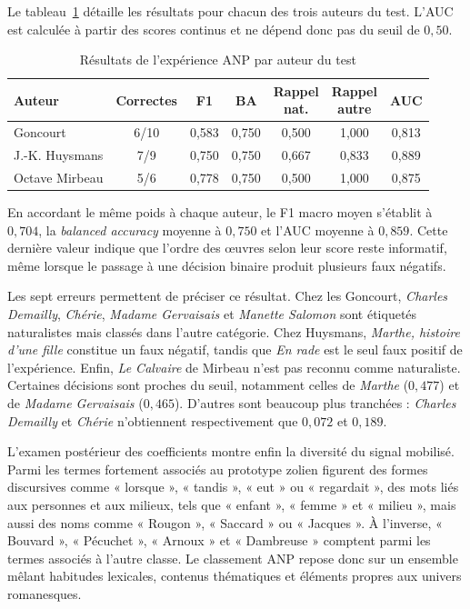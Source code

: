Le tableau~\ref{tab:resultats_anp_auteurs} détaille les résultats pour chacun des trois auteurs du test. L'AUC est calculée à partir des scores continus et ne dépend donc pas du seuil de $0{,}50$.

\begin{table}[H]
    \centering
    \caption{Résultats de l'expérience ANP par auteur du test}
    \label{tab:resultats_anp_auteurs}
    \small
    \setlength{\tabcolsep}{4pt}
    \begin{tabularx}{\textwidth}{>{\raggedright\arraybackslash}X c c c c c c}
        \toprule
        \textbf{Auteur} & \textbf{Correctes} & \textbf{F1} & \textbf{BA}
        & \shortstack{\textbf{Rappel}\\\textbf{nat.}}
        & \shortstack{\textbf{Rappel}\\\textbf{autre}}
        & \textbf{AUC} \\
        \midrule
        Goncourt & 6/10 & 0,583 & 0,750 & 0,500 & 1,000 & 0,813 \\
        J.-K. Huysmans & 7/9 & 0,750 & 0,750 & 0,667 & 0,833 & 0,889 \\
        Octave Mirbeau & 5/6 & 0,778 & 0,750 & 0,500 & 1,000 & 0,875 \\
        \bottomrule
    \end{tabularx}
\end{table}

En accordant le même poids à chaque auteur, le F1 macro moyen s'établit à $0{,}704$, la \textit{balanced accuracy} moyenne à $0{,}750$ et l'AUC moyenne à $0{,}859$. Cette dernière valeur indique que l'ordre des œuvres selon leur score reste informatif, même lorsque le passage à une décision binaire produit plusieurs faux négatifs.

Les sept erreurs permettent de préciser ce résultat. Chez les Goncourt, \textit{Charles Demailly}, \textit{Chérie}, \textit{Madame Gervaisais} et \textit{Manette Salomon} sont étiquetés naturalistes mais classés dans l'autre catégorie. Chez Huysmans, \textit{Marthe, histoire d'une fille} constitue un faux négatif, tandis que \textit{En rade} est le seul faux positif de l'expérience. Enfin, \textit{Le Calvaire} de Mirbeau n'est pas reconnu comme naturaliste. Certaines décisions sont proches du seuil, notamment celles de \textit{Marthe} ($0{,}477$) et de \textit{Madame Gervaisais} ($0{,}465$). D'autres sont beaucoup plus tranchées : \textit{Charles Demailly} et \textit{Chérie} n'obtiennent respectivement que $0{,}072$ et $0{,}189$.

L'examen postérieur des coefficients montre enfin la diversité du signal mobilisé. Parmi les termes fortement associés au prototype zolien figurent des formes discursives comme « lorsque », « tandis », « eut » ou « regardait », des mots liés aux personnes et aux milieux, tels que « enfant », « femme » et « milieu », mais aussi des noms comme « Rougon », « Saccard » ou « Jacques ». À l'inverse, « Bouvard », « Pécuchet », « Arnoux » et « Dambreuse » comptent parmi les termes associés à l'autre classe. Le classement ANP repose donc sur un ensemble mêlant habitudes lexicales, contenus thématiques et éléments propres aux univers romanesques.

